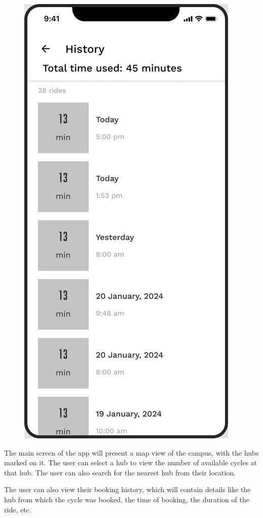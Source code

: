 \documentclass[11pt]{article}
\begin{document}
\begin{figure}[h]
    \includegraphics[scale=0.3]{history-ui.png}
\end{figure}

The main screen of the app will present a map view of the campus, with the hubs marked on it. The user can select a hub to view the number of available cycles at that hub. The user can also search for the nearest hub from their location. 

The user can also view their booking history, which will contain details like the hub from which the cycle was booked, the time of booking, the duration of the ride, etc.
\end{document}
